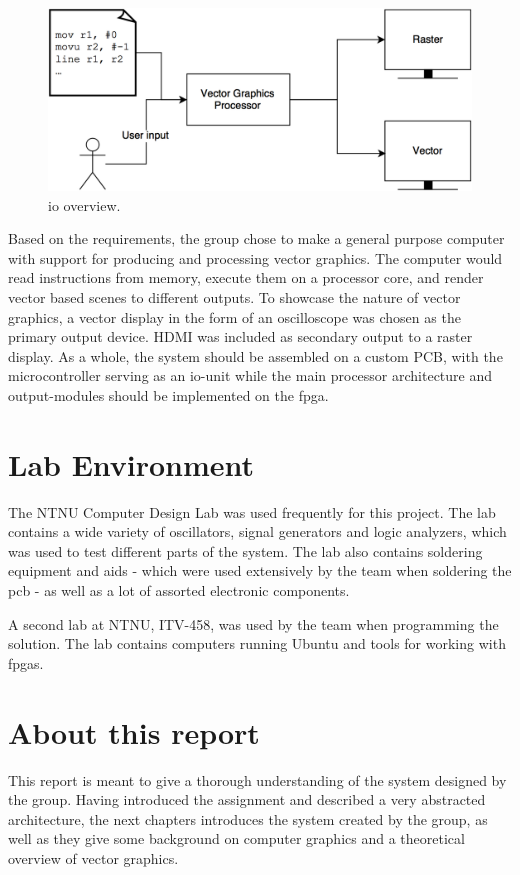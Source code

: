 \begin{figure}[H]
    \includegraphics[width=\linewidth]{images/high_level_io.png}
    \caption{\gls{io} overview.}
    \label{fig:io-overview}
\end{figure}

Based on the requirements, the group chose to make a general purpose computer with support for producing and processing vector graphics.
The computer would read instructions from memory, execute them on a processor core, and render vector based scenes to different outputs.
To showcase the nature of vector graphics, a vector display in the form of an oscilloscope was chosen as the primary output device.
HDMI was included as secondary output to a raster display.
As a whole, the system should be assembled on a custom PCB, with the microcontroller serving as an \gls{io}-unit while the main processor architecture and output-modules should be implemented on the \gls{fpga}.

\section{Lab Environment}
The NTNU Computer Design Lab was used frequently for this project.
The lab contains a wide variety of oscillators, signal generators and logic analyzers, which was used to test different parts of the system.
The lab also contains soldering equipment and aids - which were used extensively by the team when soldering the \gls{pcb} - as well as a lot of assorted electronic components.

A second lab at NTNU, ITV-458, was used by the team when programming the solution.
The lab contains computers running Ubuntu and tools for working with \gls{fpga}s.

\section{About this report}
This report is meant to give a thorough understanding of the system designed by the group.
Having introduced the assignment and described a very abstracted architecture, the next chapters introduces the system created by the group, as well as they give some background on computer graphics and a theoretical overview of vector graphics.


